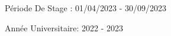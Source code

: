 \begin{titlepage}
\begin{center}
\smallskip
\vskip1cm
 
\begin{minipage}[c]{0.5\columnwidth}
Période De Stage : 01/04/2023 - 30/09/2023

\end{minipage}


\vskip0.9cm

{\large Année Universitaire: 2022 - 2023}\\[1cm] 

 \end{center}

\vfill %

\end{titlepage}


%